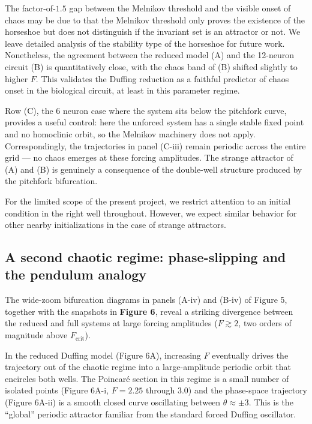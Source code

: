 \documentclass[11pt]{article}
\begin{document}
The factor-of-$1.5$ gap between the Melnikov threshold and the visible onset of chaos may be due to that the Melnikov threshold only proves the existence of the horseshoe but does not distinguish if the invariant set is an attractor or not. We leave detailed analysis of the stability type of the horseshoe for future work. Nonetheless, the agreement between the reduced model (A) and the 12-neuron circuit (B) is quantitatively close, with the chaos band of (B) shifted slightly to higher $F$. This validates the Duffing reduction as a faithful predictor of chaos onset in the biological circuit, at least in this parameter regime.

Row (C), the 6 neuron case where the system sits below the pitchfork curve, provides a useful control: here the unforced system has a single stable fixed point and no homoclinic orbit, so the Melnikov machinery does not apply. Correspondingly, the trajectories in panel (C-iii) remain periodic across the entire grid --- no chaos emerges at these forcing amplitudes. The strange attractor of (A) and (B) is genuinely a consequence of the double-well structure produced by the pitchfork bifurcation.

For the limited scope of the present project, we restrict attention to an initial condition in the right well throughout. However, we expect similar behavior for other nearby initializations in the case of strange attractors.

\subsection{A second chaotic regime: phase-slipping and the pendulum analogy}

The wide-zoom bifurcation diagrams in panels (A-iv) and (B-iv) of Figure 5, together with the snapshots in \textbf{Figure 6}, reveal a striking divergence between the reduced and full systems at large forcing amplitudes ($F \gtrsim 2$, two orders of magnitude above $F_{\text{crit}}$).

In the reduced Duffing model (Figure 6A), increasing $F$ eventually drives the trajectory out of the chaotic regime into a large-amplitude periodic orbit that encircles both wells. The Poincaré section in this regime is a small number of isolated points (Figure 6A-i, $F = 2.25$ through $3.0$) and the phase-space trajectory (Figure 6A-ii) is a smooth closed curve oscillating between $\theta \approx \pm 3$. This is the ``global'' periodic attractor familiar from the standard forced Duffing oscillator.
\end{document}
